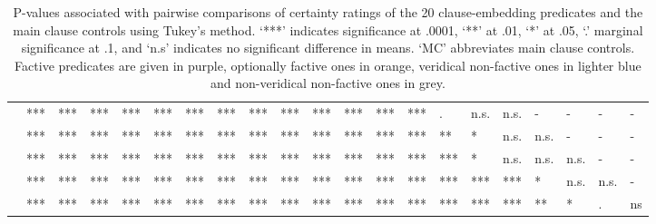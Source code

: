 \documentclass[11pt,fleqn]{article}
\newcommand{\6}{\mbox{$[\hspace*{-.6mm}[$}}
\newcommand{\9}{\mbox{$]\hspace*{-.6mm}]$}}
\begin{document}
\begin{table}[h!]
\begin{tabular}{l l l l l l l l l l l l l l l l l l l l l }
\color{violet}{\em discover}\color{black}	& ***		& *** & *** & *** & *** & *** & *** & *** & *** & *** &  ***  &  ***  &  ***  & . & n.s. & n.s. & - & - & - & - \\
\color{orange}{\em inform}\color{black}		&***		& *** & *** & *** & *** & *** & *** & *** & *** & *** & *** & *** &  ***  & ** & * & n.s. & n.s. & - & - & - \\
\color{violet}{\em see}\color{black}		&***		& *** & *** & *** & *** & *** & *** & *** & *** & *** & *** &  ***  &  ***  &  ***  & * & n.s. & n.s. & n.s. & - & - \\
\color{violet}{\em know}\color{black}		&***		& *** & *** & *** & *** & *** & *** & *** & *** & *** & *** & *** & *** & *** & *** & *** & * & n.s. & n.s. & -  \\
\color{violet}{\em be annoyed}\color{black}	&***		& *** & *** & *** & *** & *** & *** & *** & *** & ***  & ***  & *** & *** & *** & *** & *** & ** & * & . & ns  \\

\bottomrule
\end{tabular}
\caption{P-values associated with pairwise comparisons of certainty ratings of the 20 clause-embedding predicates and the main clause controls using Tukey's method. `***' indicates significance at .0001, `**' at .01, `*' at .05, `.' marginal significance at .1, and `n.s' indicates no significant difference in means. `MC' abbreviates main clause controls. Factive predicates are given in purple, optionally factive ones in orange, veridical non-factive ones in lighter blue and non-veridical non-factive ones in grey.}\label{t-pairwise-proj}
\end{table} 
\end{document}
